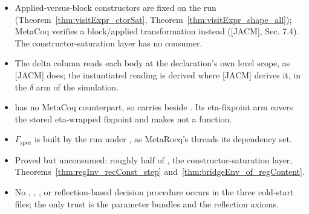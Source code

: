 \begin{itemize}
\item Applied-versus-block constructors are fixed on the run (Theorem~\ref{thm:visitExpr_ctorSat},
Theorem~\ref{thm:visitExpr_shape_all}); MetaCoq verifies a block/applied transformation instead ([JACM],
Sec. 7.4). The constructor-saturation layer has no consumer.
\item The delta column reads each body at the declaration's own level scope, as [JACM] does; the
instantiated reading is derived where [JACM] derives it, in the $\delta$ arm of the simulation.
\item \Lower{} has no MetaCoq counterpart, so  carries  beside
. Its eta-fixpoint arm covers the stored eta-wrapped fixpoint and makes \Lower{} not a
function.
\item $\Gamma_{\mathrm{spec}}$ is built by the run under , as MetaRocq's
 threads its dependency set.
\item Proved but unconsumed: roughly half of , the constructor-saturation layer,
Theorems~\ref{thm:regInv_recConst_step} and~\ref{thm:bridgeEnv_of_regContent}.
\item No , , ,  or reflection-based decision
procedure occurs in the three cold-start files; the only trust is the parameter bundles and the
 reflection axioms.
\end{itemize}
